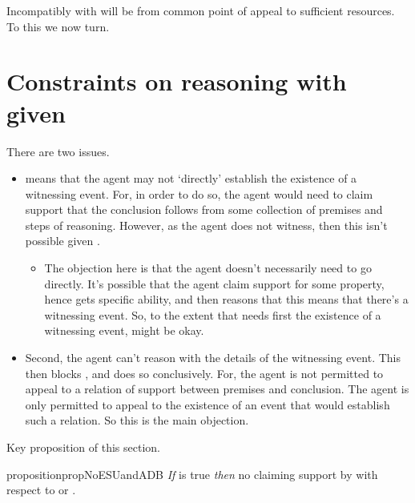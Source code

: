 \begin{note}
  Incompatibly with \ESU{} will be from common point of appeal to sufficient resources.
  To this we now turn.
\end{note}

\section{Constraints on reasoning with \gsi{} given \ESU{}}
\label{sec:incomp-wr-ura}

\begin{note}
  \color{red}
  There are two issues.
  \begin{itemize}
  \item \ESU{} means that the agent may not `directly' establish the existence of a witnessing event.
    For, in order to do so, the agent would need to claim support that the conclusion follows from some collection of premises and steps of reasoning.
    However, as the agent does not witness, then this isn't possible given \ESU{}.
    \begin{itemize}
    \item The objection here is that the agent doesn't necessarily need to go directly.
      It's possible that the agent claim support for some property, hence gets specific ability, and then reasons that this means that there's a witnessing event.
      So, to the extent that \WR{} needs first the existence of a witnessing event, \ESU{} might be okay.
    \end{itemize}
  \item Second, the agent can't reason with the details of the witnessing event.
    This then blocks \WR{}, and does so conclusively.
    For, the agent is not permitted to appeal to a relation of support between premises and conclusion.
    The agent is only permitted to appeal to the existence of an event that would establish such a relation.
    So this is the main objection.
  \end{itemize}
\end{note}

Key proposition of this section.

\begin{note}[Proposition]
    \begin{restatable}{proposition}{propNoESUandADB}\label{mcA:WR-and-denied-claim}
    \emph{If} \ESU{} is true \emph{then} no claiming support by \adB{} with respect to \ARD{} or \WR{}.
  \end{restatable}
\end{note}

